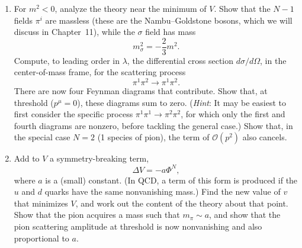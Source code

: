\begin{enumerate}[label=(\alph*)]
    and $\sigma\sigma\pi\pi$ and $\sigma\pi\pi\pi$ vertices.)
  \item For $m^2 < 0$, analyze the theory near the minimum of $V$.  Show
    that the $N-1$ fields $\pi^i$ are massless (these are the Nambu--Goldstone
    bosons, which we will discuss in Chapter~11), while the $\sigma$ field
    has mass
    \begin{equation}
      m_\sigma^2 = -\frac{2}{3}m^2 .
    \end{equation}
    Compute, to leading order in $\lambda$, the differential cross section
    $d\sigma/d\Omega$, in the center-of-mass frame, for the scattering
    process
    \begin{equation}
      \pi^1\pi^2 \to \pi^1\pi^2 .
    \end{equation}
    There are now four Feynman diagrams that contribute.  Show that, at
    threshold ($p^\mu = 0$), these diagrams sum to zero.  (\emph{Hint}: It
    may be easiest to first consider the specific process
    $\pi^1\pi^1\to\pi^2\pi^2$, for which only the first and fourth diagrams
    are nonzero, before tackling the general case.)  Show that, in the
    special case $N=2$ (1 species of pion), the term of $\mathcal{O}(p^2)$
    also cancels.
  \item Add to $V$ a symmetry-breaking term,
    \begin{equation}
      \Delta V = -a\Phi^N ,
    \end{equation}
    where $a$ is a (small) constant.  (In QCD, a term of this form is
    produced if the $u$ and $d$ quarks have the same nonvanishing mass.)
    Find the new value of $v$ that minimizes $V$, and work out the content
    of the theory about that point.  Show that the pion acquires a mass such
    that $m_\pi \sim a$, and show that the pion scattering amplitude at
    threshold is now nonvanishing and also proportional to $a$.
\end{enumerate}

